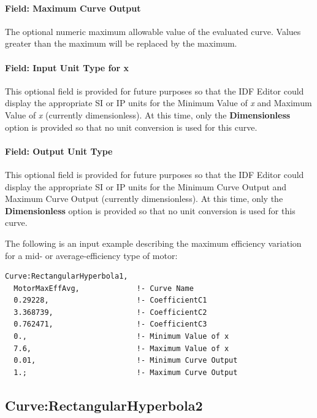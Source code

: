 \paragraph{Field: Maximum Curve Output}\label{field-maximum-curve-output-13}

The optional numeric maximum allowable value of the evaluated curve. Values greater than the maximum will be replaced by the maximum.

\paragraph{Field: Input Unit Type for x}\label{field-input-unit-type-for-x-14}

This optional field is provided for future purposes so that the IDF Editor could display the appropriate SI or IP units for the Minimum Value of \emph{x} and Maximum Value of \emph{x} (currently dimensionless). At this time, only the \textbf{Dimensionless} option is provided so that no unit conversion is used for this curve.

\paragraph{Field: Output Unit Type}\label{field-output-unit-type-13}

This optional field is provided for future purposes so that the IDF Editor could display the appropriate SI or IP units for the Minimum Curve Output and Maximum Curve Output (currently dimensionless). At this time, only the \textbf{Dimensionless} option is provided so that no unit conversion is used for this curve.

The following is an input example describing the maximum efficiency variation for a mid- or average-efficiency type of motor:

\begin{lstlisting}
Curve:RectangularHyperbola1,
  MotorMaxEffAvg,             !- Curve Name
  0.29228,                    !- CoefficientC1
  3.368739,                   !- CoefficientC2
  0.762471,                   !- CoefficientC3
  0.,                         !- Minimum Value of x
  7.6,                        !- Maximum Value of x
  0.01,                       !- Minimum Curve Output
  1.;                         !- Maximum Curve Output
\end{lstlisting}

\subsection{Curve:RectangularHyperbola2}\label{curverectangularhyperbola2}

